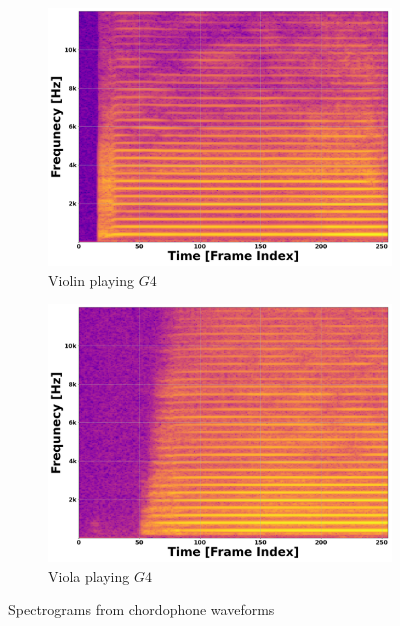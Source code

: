 \documentclass[12pt,letterpaper]{article}
\begin{document}
\begin{figure}[H]
	\begin{subfigure}{0.45\textwidth}
	\centering
	\includegraphics[scale=0.2]{../FiguresSpectrogram/Violin-G4}
	\caption{Violin playing $G4$}
	\end{subfigure}
	\hfill
	\begin{subfigure}{0.45\textwidth}
	\centering
	\includegraphics[scale=0.2]{../FiguresSpectrogram/Viola-G4}
	\caption{Viola playing $G4$}
	\end{subfigure}
\caption{Spectrograms from chordophone waveforms}	
\label{fig-PropertiesChordophones}
\end{figure}
\end{document}
